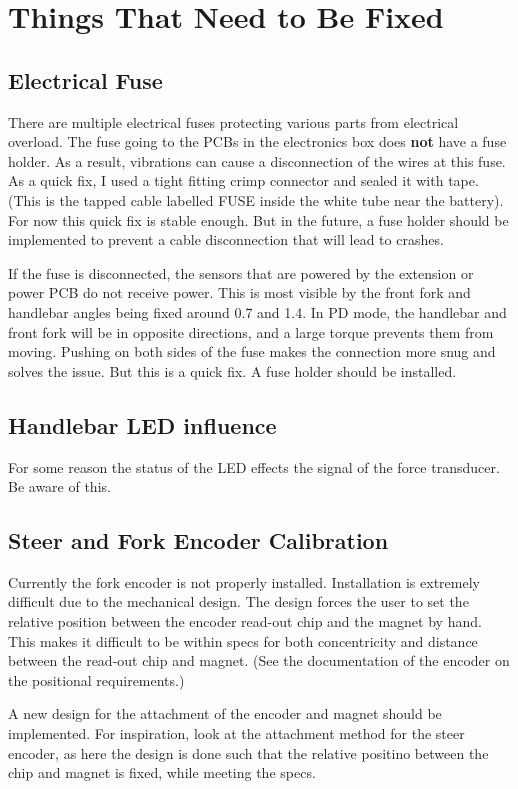 \section{Things That Need to Be Fixed}
\subsection{Electrical Fuse} \label{sec:loose_fuse}
There are multiple electrical fuses protecting various parts from electrical overload. The fuse going to the PCBs in the electronics box does \textbf{not} have a fuse holder. As a result, vibrations can cause a disconnection of the wires at this fuse. As a quick fix, I used a tight fitting crimp connector and sealed it with tape. (This is the tapped cable labelled FUSE inside the white tube near the battery). For now this quick fix is stable enough. But in the future, a fuse holder should be implemented to prevent a cable disconnection that will lead to crashes.

If the fuse is disconnected, the sensors that are powered by the extension or power PCB do not receive power. This is most visible by the front fork and handlebar angles being fixed around 0.7 and 1.4. In PD mode, the handlebar and front fork will be in opposite directions, and a large torque prevents them from moving. Pushing on both sides of the fuse makes the connection more snug and solves the issue. But this is a quick fix. A fuse holder should be installed.

\subsection{Handlebar LED influence}
For some reason the status of the LED effects the signal of the force transducer.
Be aware of this.

\subsection{Steer and Fork Encoder Calibration} \label{sec:fork_encoder}
Currently the fork encoder is not properly installed. Installation is extremely difficult due to the mechanical design. The design forces the user to set the relative position between the encoder read-out chip and the magnet by hand. This makes it difficult to be within specs for both concentricity and distance between the read-out chip and magnet. (See the documentation of the encoder on the positional requirements.)

A new design for the attachment of the encoder and magnet should be implemented. For inspiration, look at the attachment method for the steer encoder, as here the design is done such that the relative positino between the chip and magnet is fixed, while meeting the specs.

